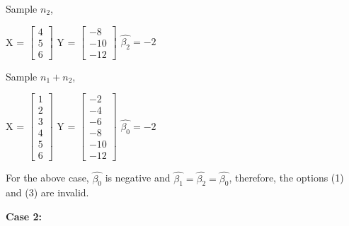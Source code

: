 \documentclass[12pt]{article}
\begin{document}
\vspace{3mm}

\noindent Sample $n_2$,
\vspace{3mm}

\begin{center}

X = $
\begin{bmatrix}
4\\5\\6
\end{bmatrix}
$
\hspace{2mm} Y = $
\begin{bmatrix}
-8\\-10\\-12
\end{bmatrix}
$
\hspace{2mm} $\hat{\beta_2} =  -2$
\end{center}

\vspace{3mm}

\noindent Sample $n_1+n_2$,
\vspace{3mm}

\begin{center}

X = $
\begin{bmatrix}
1\\2\\3\\4\\5\\6
\end{bmatrix}
$
\hspace{2mm} Y = $
\begin{bmatrix}
-2\\-4\\-6\\-8\\-10\\-12
\end{bmatrix}
$
\hspace{2mm} $\hat{\beta_0} =  -2$
\end{center}

\vspace{3mm}

\noindent For the above case, $\hat{\beta_0}$ is negative and $\hat{\beta_1} = \hat{\beta_2} = \hat{\beta_0}$, therefore, the options (1) and (3) are invalid.

\clearpage

\vspace{3mm}
\noindent \textbf{Case 2:}
\vspace{3mm}
\end{document}
